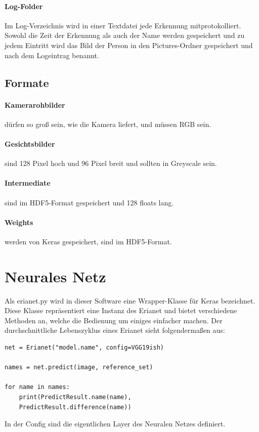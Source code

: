 \documentclass[12pt]{article}
\begin{document}
\paragraph{Log-Folder}
Im Log-Verzeichnis wird in einer Textdatei jede Erkennung mitprotokolliert.
Sowohl die Zeit der Erkennung als auch der Name werden gespeichert und zu
jedem Eintritt wird das Bild der Person in den Pictures-Ordner gespeichert
und nach dem Logeintrag benannt.
\subsection{Formate}
\paragraph{Kamerarohbilder}
dürfen so groß sein, wie die Kamera liefert, und müssen RGB sein.
\paragraph{Gesichtsbilder}
sind 128 Pixel hoch und 96 Pixel breit und sollten in Greyscale 
sein.
\paragraph{Intermediate}
sind im HDF5-Format gespeichert und 128 floats lang.
\paragraph{Weights}
werden von Keras gespeichert, sind im HDF5-Format. 
\label{formats}

\pagebreak
\section{Neurales Netz}
Als erianet.py wird in dieser Software eine Wrapper-Klasse für 
Keras bezeichnet. Diese Klasse repräsentiert eine Instanz des 
Erianet und bietet verschiedene Methoden an, welche die 
Bedienung um einiges einfacher machen. Der durchschnittliche
Lebenszyklus eines Erianet sieht folgendermaßen aus:
\begin{lstlisting}[frame=single]
net = Erianet("model.name", config=VGG19ish)

names = net.predict(image, reference_set)

for name in names:
    print(PredictResult.name(name), 
    PredictResult.difference(name))
\end{lstlisting}
In der Config sind die eigentlichen Layer des Neuralen Netzes definiert.
\end{document}
